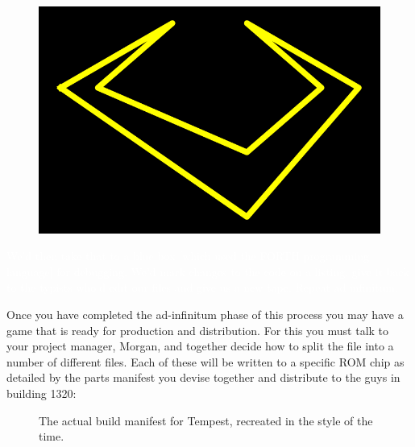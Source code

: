 \begin{definition}
\setlength{\intextsep}{0pt}%
\setlength{\columnsep}{3pt}%
\begin{figure}
\includegraphics[width=\linewidth]{src/callout/claw_t.png} 
\end{figure}
\small
\textcolor{white}{
We’d then take that to a blue box [which used the
FORTH programming language] for debugging. We’d mark changes to the code on a
listing, give it back to the typists who’d edit our files and give us a new
tape. Repeat ad infinitum.
}
\end{definition}

Once you have completed the ad-infinitum phase of this process you may have a game that is ready
for production and distribution. For this you must talk to your project manager, Morgan, and together
decide how to split the  file into a number of different files. Each of these will
be written to a specific ROM chip as detailed by the parts manifest you devise together and distribute to
the guys in building 1320:
\begin{figure}[H]
      \centering
    \caption{The actual build manifest for Tempest, recreated in the style of the time.}
\end{figure}

